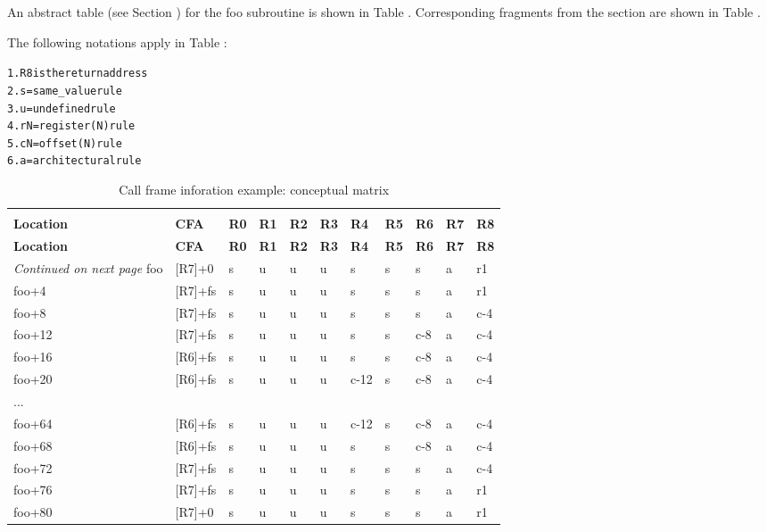 An abstract table 
(see Section ) 
for the foo subroutine
is shown in 
Table .
Corresponding fragments from the
 section are shown in 
Table .

The following notations apply in 
Table :

\begin{alltt}
1. R8 is the return address
2. s = same\_value rule
3. u = undefined rule
4. rN = register(N) rule
5. cN = offset(N) rule
6. a = architectural rule
\end{alltt}

\begin{centering}
\setlength{\extrarowheight}{0.1cm}
\begin{longtable}{lllllllllll}
  \caption{Call frame inforation example: conceptual matrix} \label{tab:callframeinformationexampleconceptualmatrix} \\
  \hline \\ \bfseries Location & \bfseries CFA & \bfseries R0 & \bfseries R1 & \bfseries R2 & \bfseries R3 & \bfseries R4 & \bfseries R5 & \bfseries R6 & \bfseries R7 & \bfseries R8 \\ \hline
\endfirsthead
  \bfseries Location &\bfseries CFA &\bfseries R0 & \bfseries R1 & \bfseries R2 &\bfseries R3 &\bfseries R4 &\bfseries R5 &\bfseries R6 &\bfseries R7 &\bfseries R8\\ \hline
\endhead
  \hline \emph{Continued on next page}
\endfoot
  \hline
\endlastfoot
foo&[R7]+0&s&u&u&u&s&s&s&a&r1 \\
foo+4&[R7]+fs&s&u&u&u&s&s&s&a&r1 \\
foo+8&[R7]+fs&s&u&u&u&s&s&s&a&c-4 \\
foo+12&[R7]+fs&s&u&u&u&s&s&c-8&a&c-4 \\
foo+16&[R6]+fs&s&u&u&u&s&s&c-8&a&c-4 \\
foo+20&[R6]+fs&s&u&u&u&c-12&s&c-8&a&c-4 \\
...&&&&&&&&&& \\
foo+64&[R6]+fs&s&u&u&u&c-12&s&c-8&a&c-4 \\
foo+68&[R6]+fs&s&u&u&u&s&s&c-8&a&c-4  \\
foo+72&[R7]+fs&s&u&u&u&s&s&s&a&c-4  \\
foo+76&[R7]+fs&s&u&u&u&s&s&s&a&r1 \\
foo+80&[R7]+0&s&u&u&u&s&s&s&a&r1 \\
\end{longtable}
\end{centering}


